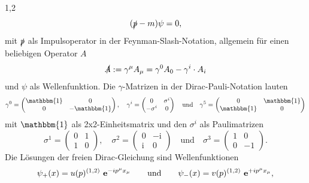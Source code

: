 \documentclass[11pt,a4paper,twoside]{report}
\begin{document}
\begin{spacing}{1,2}
\begin{equation}
 (\slashed{p} - m )\psi = 0,
 \label{eq_dirac}
\end{equation}
mit $\slashed{p}$ als Impulsoperator in der Feynman-Slash-Notation, allgemein für einen beliebigen Operator $A$
\begin{equation}
 \slashed{A} := \gamma^\mu A_\mu = \gamma^0 A_0 - \gamma^i\cdot A_i
\end{equation}
und $\psi$ als Wellenfunktion.
Die $\gamma$-Matrizen in der Dirac-Pauli-Notation lauten
\begin{equation*}
  \gamma^0 = \begin{pmatrix} 
              \mathbbm{1} & 0 \\
              0 & -\mathbbm{1}
             \end{pmatrix},\quad \gamma^i = \begin{pmatrix}
					0 & \sigma^i\\
					-\sigma^i & 0
				      \end{pmatrix} \quad \text{und}\quad \gamma^5 = \begin{pmatrix}
									  0 & \mathbbm{1}\\
									  \mathbbm{1} & 0
									   \end{pmatrix}
\end{equation*}
mit $\mathbbm{1}$ als 2x2-Einheitsmatrix und den $\sigma^i$ als Paulimatrizen
\begin{equation*}
 \sigma^1 = \begin{pmatrix}
             0 & 1\\
             1 & 0
            \end{pmatrix},\quad \sigma^2 = \begin{pmatrix}
					    0 & -\text{i}\\
					    \text{i} & 0
					    \end{pmatrix}\quad \text{und} \quad\sigma^3 = \begin{pmatrix}
									    1 & 0\\
									    0 & -1
									    \end{pmatrix}.									    
\end{equation*}
Die Lösungen der freien Dirac-Gleichung sind Wellenfunktionen
\begin{align}
 \psi_+(x) = u(p)^{(1,2)} \ \mathbf{e}^{-ip^\mu x_\mu}\qquad\text{und}\qquad \psi_-(x) = v(p)^{(1,2)} \ \mathbf{e}^{+ip^\mu x_\mu},
 \label{eq_diracLsg}
\end{align}

\end{spacing}
\end{document}
